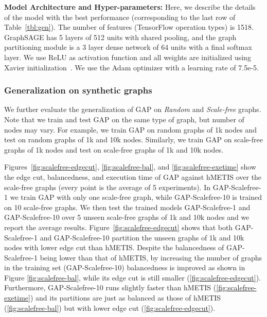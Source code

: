 \documentclass[10pt,twocolumn]{article}
\begin{document}
\noindent\textbf{Model Architecture and Hyper-parameters:}
Here, we describe the details of the model with the best performance (corresponding to the last row of Table~\ref{tbl:gen}). The number of features (TensorFlow operation types) is 1518. GraphSAGE has 5 layers of 512 units with shared pooling, and the graph partitioning module is a 3 layer dense network of 64 units with a final softmax layer. We use ReLU as activation function and all weights are initialized using Xavier initialization~\cite{Xavier_2010}. We use the Adam optimizer with a learning rate of 7.5e-5.









\subsubsection{Generalization on synthetic graphs}
We further evaluate the generalization of GAP on \textit{Random} and \textit{Scale-free} graphs. Note that we train and test GAP on the same type of graph, but number of nodes may vary. For example, we train GAP on random graphs of 1k nodes and test on random graphs of 1k and 10k nodes. Similarly, we train GAP on scale-free graphs of 1k nodes and test on scale-free graphs of 1k and 10k nodes.

Figures~\ref{fig:scalefree-edgecut}, \ref{fig:scalefree-bal}, and \ref{fig:scalefree-exetime} show the edge cut, balancedness, and execution time of GAP against hMETIS over the scale-free graphs (every point is the average of 5 experiments). 
In GAP-Scalefree-1 we train GAP with only one scale-free graph, while GAP-Scalefree-10 is trained on 10 scale-free graphs. We then test the trained models GAP-Scalefree-1 and GAP-Scalefree-10 over 5 unseen scale-free graphs of 1k and 10k nodes and we report the average results. Figure~\ref{fig:scalefree-edgecut} shows that both GAP-Scalefree-1 and GAP-Scalefree-10 partition the unseen graphs of 1k and 10k nodes with lower edge cut than hMETIS. Despite the balancedness of GAP-Scalefree-1 being lower than that of hMETIS, by increasing the number of graphs in the training set (GAP-Scalefree-10) balancedness is improved as shown in Figure \ref{fig:scalefree-bal}, while its edge cut is still smaller (\ref{fig:scalefree-edgecut}). Furthermore, GAP-Scalefree-10 runs slightly faster than hMETIS (\ref{fig:scalefree-exetime}) and its partitions are just as balanced as those of hMETIS (\ref{fig:scalefree-bal}) but with lower edge cut (\ref{fig:scalefree-edgecut}).
\end{document}
